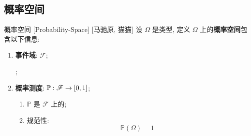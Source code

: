 \documentclass[UTF8]{ctexart}
\begin{document}





    \subsection{概率空间}

        \begin{str}
            {概率空间}
            [Probability-Space]
            [马驰原, 猫猫]
            设 \(\Omega\) 是类型, 定义 \(\Omega\) 上的\textbf{概率空间}包含以下信息: 
            \begin{enumerate}
                \item \textbf{事件域}: \(\mathscr{F}\); 
                    
                    ; 

                \item \textbf{概率测度}: \(\mathbb{P}: \mathscr{F}\to\Icc{0}{1}\); 
                    \begin{enumerate}
                        \item \(\mathbb{P}\) 是 \(\mathscr{F}\) 上的; 
                        \item 规范性: 
                            \[\mathbb{P}(\Omega)=1\]
                    \end{enumerate}
            \end{enumerate}
        \end{str}
\end{document}
